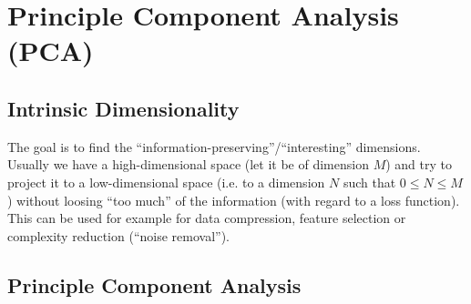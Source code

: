 \chapter{Principle Component Analysis (PCA)}

\section{Intrinsic Dimensionality}
The goal is to find the ``information-preserving''/``interesting'' dimensions. Usually we have a high-dimensional space (let it be of dimension \(M\)) and try to project it to a low-dimensional space (i.e. to a dimension \(N\) such that \(0 \leq N \leq M\)) without loosing ``too much'' of the information (with regard to a loss function). This can be used for example for data compression, feature selection or complexity reduction (``noise removal'').

\section{Principle Component Analysis}

